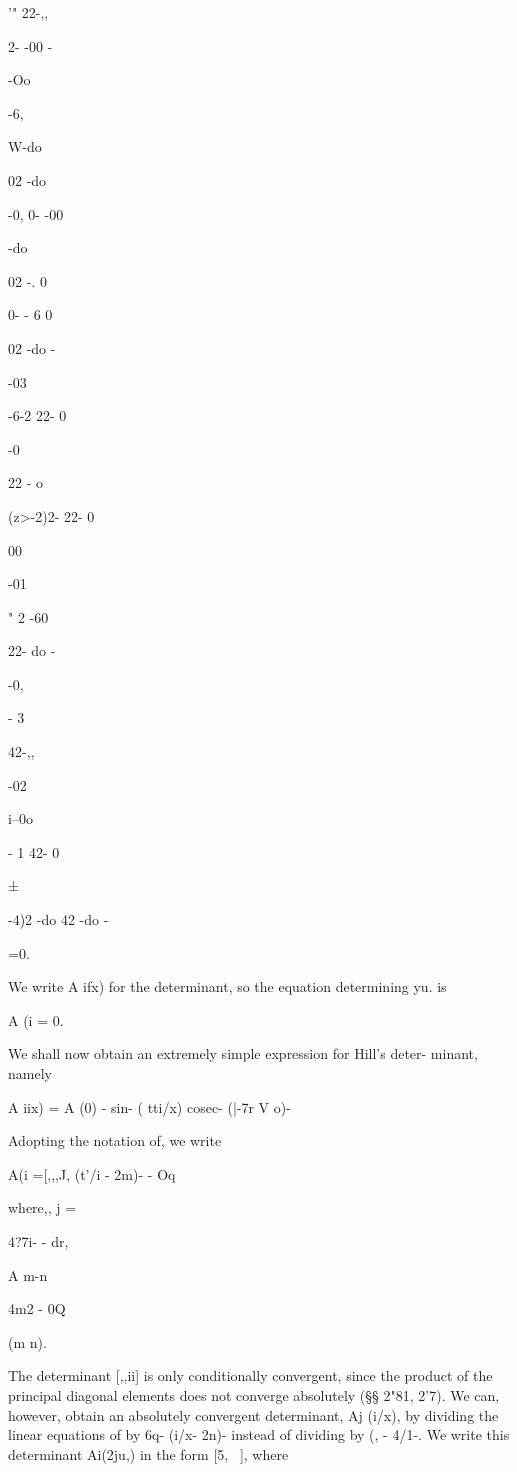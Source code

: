 '" 22-,,

2- -00 -

-Oo

-6,

W-do

02 -do

-0, 0- -00

-do

  02 -. 0

0- - 6 0

02 -do -

-03

-6-2 22- 0

-0

22 - o

(z>-2)2- 22- 0

00

-01

" 2 -60

22- do -

-0,

- 3

42-,,

-02

i--0o

- 1 42- 0

 ±

-4)2 -do 42 -do -

=0.

We write A ifx) for the determinant, so the equation determining yu.
is

A (i = 0.


We shall now obtain an extremely simple expression for Hill's deter-
minant, namely

A iix) = A (0) - sin- ( tti/x) cosec- (|-7r V o)-

Adopting the notation of, we write

A(i =[,,,J, (t'/i - 2m)- - Oq

where,, j =

4?7i- - dr,

A m-n

4m2 - 0Q

(m n).

The determinant [,,ii] is only conditionally convergent, since the
product of the principal diagonal elements does not converge
absolutely (§§ 2"81, 2'7). We can, however, obtain an absolutely
convergent determinant, Aj (i/x), by dividing the linear equations of by 6q- (i/x- 2n)- instead of dividing by (, - 4/1-. We write
this determinant Ai(2ju,) in the form [5, \ ], where

